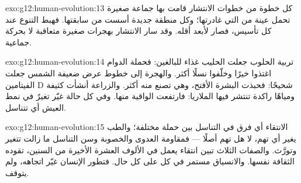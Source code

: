 \begin{solution}{exo:g12:human-evolution:13}
كل خطوة من خطوات الانتشار قامت بها جماعة صغيرة تحمل عينة من 
 التي غادرتها؛ وكل منطقة جديدة أسست من سابقتها. فهبط التنوع عند
كل تأسيس، فصار لأبعد  أقله. وقد سار الانتشار بهجرات صغيرة
متعاقبة لا بحركة جماعية.
\end{solution}

\begin{solution}{exo:g12:human-evolution:14}
تربية الحلوب جعلت الحليب غذاء للبالغين: فحملة  الدوام اغتذوا خيرًا
وخلّفوا نسلًا أكثر. والهجرة إلى خطوط عرض ضعيفة الشمس جعلت الفيتامين D
شحيحًا: فحبذت البشرة الأفتح، وهي تصنع منه أكثر. والزراعة أنشأت 
كثيفة ومياهًا راكدة تنتشر فيها الملاريا: فارتفعت  الواقية
منها. وفي كل حالة غيّر تغيرٌ في نمط العيش أي  تتناسل.
\end{solution}

\begin{solution}{exo:g12:human-evolution:15}
الانتقاء أي فرق في التناسل بين حملة  مختلفة؛ والطب يغير أي
 تهم، لا هل تهم  أصلًا --- فمقاومة العدوى والخصوبة وسن
التناسل ما زالت تتغير وتورَّث. والصفات الثلاث تبين انتقاء يعمل في
الألوف العشرة الأخيرة من السنين، تقوده الثقافة نفسها. والانسياق مستمر
في كل  على كل حال. فتطور الإنسان غيّر اتجاهه، ولم يتوقف.
\end{solution}

